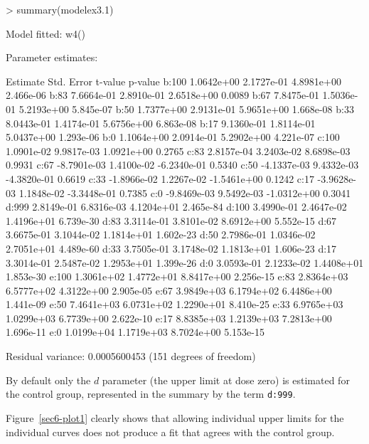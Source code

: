 \documentclass[a4paper]{article}
\begin{document}
\begin{Schunk}
\begin{Sinput}
> summary(modelex3.1)
\end{Sinput}
\begin{Soutput}
Model fitted: w4()

Parameter estimates:

         Estimate  Std. Error     t-value   p-value
b:100  1.0642e+00  2.1727e-01  4.8981e+00 2.466e-06
b:83   7.6664e-01  2.8910e-01  2.6518e+00    0.0089
b:67   7.8475e-01  1.5036e-01  5.2193e+00 5.845e-07
b:50   1.7377e+00  2.9131e-01  5.9651e+00 1.668e-08
b:33   8.0443e-01  1.4174e-01  5.6756e+00 6.863e-08
b:17   9.1360e-01  1.8114e-01  5.0437e+00 1.293e-06
b:0    1.1064e+00  2.0914e-01  5.2902e+00 4.221e-07
c:100  1.0901e-02  9.9817e-03  1.0921e+00    0.2765
c:83   2.8157e-04  3.2403e-02  8.6898e-03    0.9931
c:67  -8.7901e-03  1.4100e-02 -6.2340e-01    0.5340
c:50  -4.1337e-03  9.4332e-03 -4.3820e-01    0.6619
c:33  -1.8966e-02  1.2267e-02 -1.5461e+00    0.1242
c:17  -3.9628e-03  1.1848e-02 -3.3448e-01    0.7385
c:0   -9.8469e-03  9.5492e-03 -1.0312e+00    0.3041
d:999  2.8149e-01  6.8316e-03  4.1204e+01 2.465e-84
d:100  3.4990e-01  2.4647e-02  1.4196e+01 6.739e-30
d:83   3.3114e-01  3.8101e-02  8.6912e+00 5.552e-15
d:67   3.6675e-01  3.1044e-02  1.1814e+01 1.602e-23
d:50   2.7986e-01  1.0346e-02  2.7051e+01 4.489e-60
d:33   3.7505e-01  3.1748e-02  1.1813e+01 1.606e-23
d:17   3.3014e-01  2.5487e-02  1.2953e+01 1.399e-26
d:0    3.0593e-01  2.1233e-02  1.4408e+01 1.853e-30
e:100  1.3061e+02  1.4772e+01  8.8417e+00 2.256e-15
e:83   2.8364e+03  6.5777e+02  4.3122e+00 2.905e-05
e:67   3.9849e+03  6.1794e+02  6.4486e+00 1.441e-09
e:50   7.4641e+03  6.0731e+02  1.2290e+01 8.410e-25
e:33   6.9765e+03  1.0299e+03  6.7739e+00 2.622e-10
e:17   8.8385e+03  1.2139e+03  7.2813e+00 1.696e-11
e:0    1.0199e+04  1.1719e+03  8.7024e+00 5.153e-15

Residual variance: 0.0005600453 (151 degrees of freedom)
\end{Soutput}
\end{Schunk}
By default only the $d$ parameter (the upper limit at dose zero) is estimated for the control group, represented in the summary by the term \verb+d:999+.

Figure~\ref{sec6-plot1} clearly shows that allowing individual upper limits for the individual curves does not produce a fit that agrees with the
control group.
\end{document}
